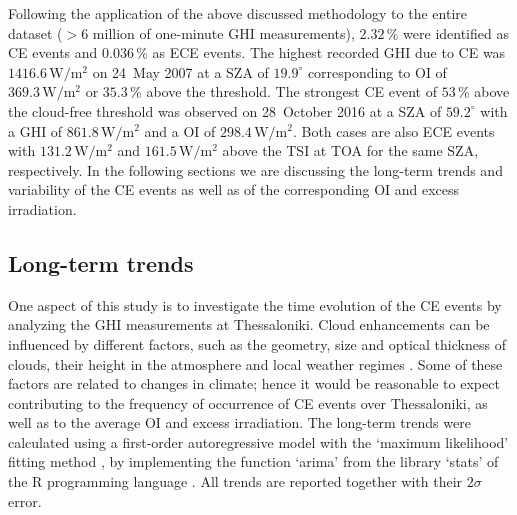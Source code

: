 \documentclass[preprint, 5p,
authoryear]{elsarticle} %
\begin{document}
Following the application of the above discussed methodology to the
entire dataset (\(>6\) million of one-minute GHI measurements),
\(2.32\,\%\) were identified as CE events and \(0.036\,\%\) as ECE
events. The highest recorded GHI due to CE was
\(1416.6\,\text{W}/\text{m}^2\) on 24~May 2007 at a SZA of
\(19.9^\circ\) corresponding to OI of \(369.3\,\text{W}/\text{m}^2\) or
\(35.3\,\%\) above the threshold. The strongest CE event of \(53\,\%\)
above the cloud-free threshold was observed on 28~October 2016 at a SZA
of \(59.2^\circ\) with a GHI of \(861.8\,\text{W}/\text{m}^2\) and a OI
of \(298.4\,\text{W}/\text{m}^2\). Both cases are also ECE events with
\(131.2\,\text{W}/\text{m}^2\) and \(161.5\,\text{W}/\text{m}^2\) above
the TSI at TOA for the same SZA, respectively. In the following sections
we are discussing the long-term trends and variability of the CE events
as well as of the corresponding OI and excess irradiation.

\hypertarget{long-term-trends}{%
\subsection{Long-term trends}\label{long-term-trends}}

One aspect of this study is to investigate the time evolution of the CE
events by analyzing the GHI measurements at Thessaloniki. Cloud
enhancements can be influenced by different factors, such as the
geometry, size and optical thickness of clouds, their height in the
atmosphere and local weather regimes
\citep{Mol2023, Veerman2022, Gristey2022, Tzoumanikas2016}. Some of
these factors are related to changes in climate; hence it would be
reasonable to expect contributing to the frequency of occurrence of CE
events over Thessaloniki, as well as to the average OI and excess
irradiation. The long-term trends were calculated using a first-order
autoregressive model with the `maximum likelihood' fitting method
\citep{Gardner1980, Jones1980}, by implementing the function `arima'
from the library `stats' of the R programming language \citep{RCT2023}.
All trends are reported together with their \(2\sigma\) error.
\end{document}
